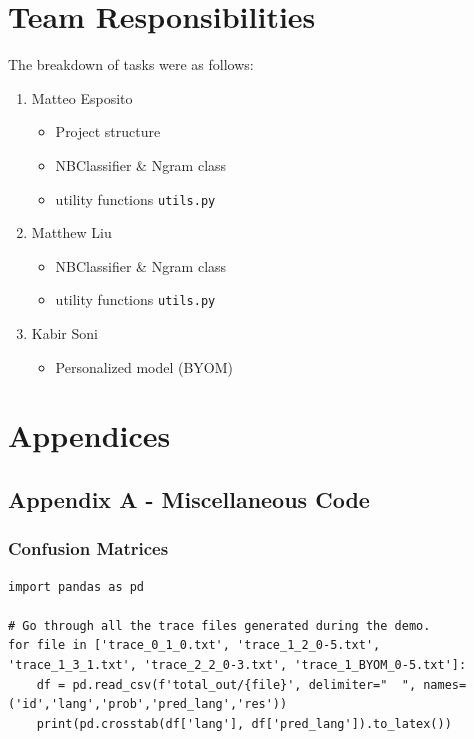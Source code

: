 \documentclass[runningheads]{llncs}
\newcommand{\code}[1]{\texttt{#1}}
\begin{document}
\newpage

\section{Team Responsibilities}

The breakdown of tasks were as follows:

\begin{enumerate}
    \item Matteo Esposito
    \begin{itemize}
        \item Project structure
        \item NBClassifier \& Ngram class
        \item utility functions \code{utils.py}
    \end{itemize}
    \item Matthew Liu
    \begin{itemize}
        \item NBClassifier \& Ngram class
        \item utility functions \code{utils.py}
    \end{itemize}
    \item Kabir Soni
    \begin{itemize}
        \item Personalized model (BYOM)
    \end{itemize}
\end{enumerate}

\section{Appendices}

\subsection{Appendix A - Miscellaneous Code}

\subsubsection{Confusion Matrices}

\begin{lstlisting}[breaklines]
import pandas as pd

# Go through all the trace files generated during the demo.
for file in ['trace_0_1_0.txt', 'trace_1_2_0-5.txt', 'trace_1_3_1.txt', 'trace_2_2_0-3.txt', 'trace_1_BYOM_0-5.txt']:
    df = pd.read_csv(f'total_out/{file}', delimiter="  ", names=('id','lang','prob','pred_lang','res'))
    print(pd.crosstab(df['lang'], df['pred_lang']).to_latex())
\end{lstlisting}
\end{document}
